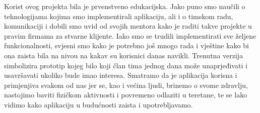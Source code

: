        {Korist ovog projekta bila je prvenstveno edukacijska. Jako puno smo naučili o tehnologijama kojima smo implementirali aplikaciju, ali i o timskom radu, komunikaciji i dobili smo uvid od svojih mentora kako je raditi  takve projekte u pravim firmama za stvarne klijente. Iako smo se trudili implementirati sve željene funkcionalnosti, svjesni smo kako je potrebno još mnogo rada i vještine kako bi ona zaista bila na nivou na kakav su korisnici danas navikli. Trenutna verzija simbolizira prototip kojeg bilo koji član tima jednog dana može unaprjeđivati i usavršavati ukoliko bude imao interesa. Smatramo da je aplikacija korisna i primjenjiva svakom od nas jer se, kao i većina ljudi, brinemo o svome zdravlju, nastojimo baviti fizičkom aktivnosti i povremeno odlaziti u teretane, te se lako vidimo kako aplikaciju u budućnosti zaista i upotrebljavamo. \\}
		
		
